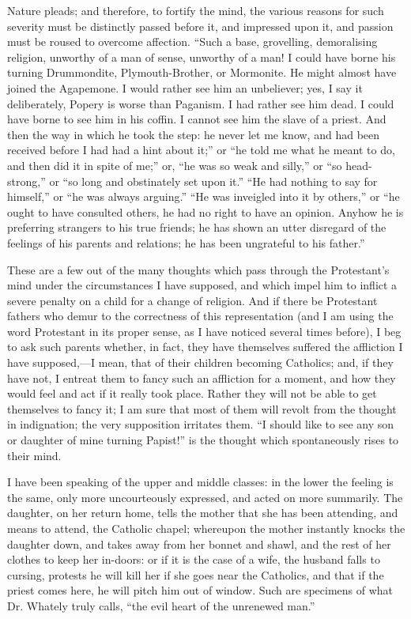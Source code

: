 Nature pleads; and therefore, to fortify the mind, the
various reasons for such severity must be distinctly
passed before it, and impressed upon it, and passion must
be roused to overcome affection. ``Such a base,
grovelling, demoralising religion, unworthy of a man of
sense, unworthy of a man! I could have borne his turning
Drummondite, Plymouth-Brother, or Mormonite. He might
almost have joined the Agapemone. I would rather see him
an unbeliever; yes, I say it deliberately, Popery is
worse than Paganism. I had rather see him dead. I could
have borne to see him in his coffin. I cannot see him the
slave of a priest. And then the way in which he took the
step: he never let me know, and had been received before
I had had a hint about it;'' or ``he told me what
he meant to do, and then did it in spite of me;'' or,
``he was so weak and silly,'' or ``so
head-strong,'' or ``so long and obstinately set
upon it.'' ``He had nothing to say for
himself,'' or ``he was always arguing.''
``He was inveigled into it by others,'' or
``he ought to have consulted others, he had no right
to have an opinion. Anyhow he is preferring strangers to
his true friends; he has shown an utter disregard of the
feelings of his parents and relations; he has been
ungrateful to his father.''

These are a few out of the many thoughts which pass
through the Protestant's mind under the circumstances I
have supposed, and which impel him to inflict a severe
penalty on a child for a change of religion. And if there
be Protestant fathers who demur to the correctness of
this representation (and I am using the word Protestant
in its proper sense, as I have noticed several times
before), I beg to ask such parents whether, in fact, they
have themselves suffered the affliction I have
supposed,—I mean, that of their children becoming
Catholics; and, if they have not, I entreat them to fancy
such an affliction for a moment, and how they would feel
and act if it really took place. Rather they will not be
able to get themselves to fancy it; I am sure that most
of them will revolt from the thought in indignation; the very supposition irritates them. ``I should like to
see any son or daughter of mine turning Papist!'' is
the thought which spontaneously rises to their mind.

I have been speaking of the upper and middle classes:
in the lower the feeling is the same, only more
uncourteously expressed, and acted on more summarily. The
daughter, on her return home, tells the mother that she
has been attending, and means to attend, the Catholic
chapel; whereupon the mother instantly knocks the
daughter down, and takes away from her bonnet and shawl,
and the rest of her clothes to keep her in-doors: or if
it is the case of a wife, the husband falls to cursing,
protests he will kill her if she goes near the Catholics,
and that if the priest comes here, he will pitch him out
of window. Such are specimens of what Dr. Whately truly
calls, ``the evil heart of the unrenewed man.''

